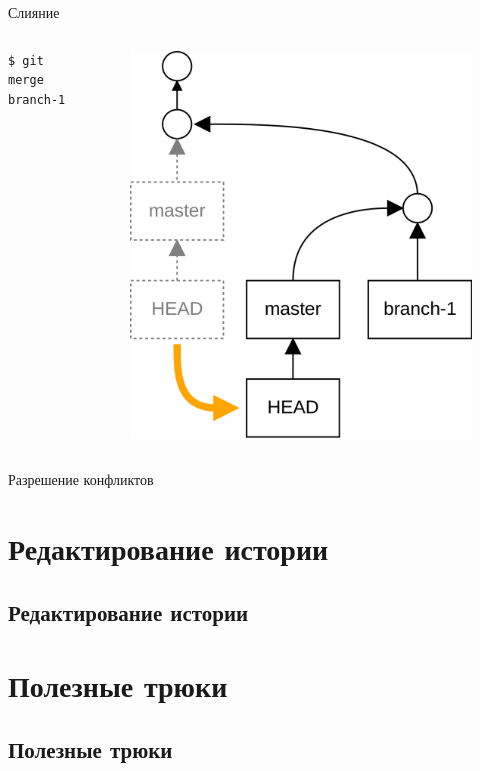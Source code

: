 \documentclass[presentation]{beamer}
\begin{document}
\begin{frame}[fragile]{Слияние}
  \begin{columns}
    \begin{column}{.5\textwidth}
\begin{verbatim}
$ git merge branch-1
\end{verbatim}
      \end{column}
      \begin{column}{.5\textwidth}
        \begin{figure}[htb]
          \centering
          \includegraphics[height=.7\textheight]{git-operation-merge-1}
        \end{figure}
      \end{column}
    \end{columns}
\end{frame}

\begin{frame}{Разрешение конфликтов}

\end{frame}



\section{Редактирование истории}

\subsection{Редактирование истории}



\section{Полезные трюки}

\subsection{Полезные трюки}
\end{document}

